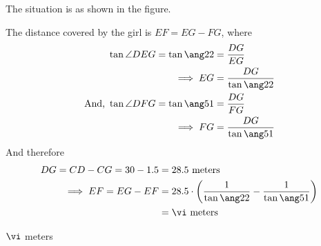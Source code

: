 \begin{solution}[\halfpage]
	The situation is as shown in the figure. 
  
  The distance covered by the girl is $EF = EG - FG$, where
	\begin{align}
		\tan\angle{DEG} = \tan\ang\va &= \dfrac{DG}{EG} \\
		\implies EG &= \dfrac{DG}{\tan\ang\va} \\
		\text{And, }\tan\angle{DFG} = \tan\ang\vb &= \dfrac{DG}{FG} \\
		\implies FG &= \dfrac{DG}{\tan\ang\vb}
	\end{align}
  And therefore 
	\begin{align}
    DG = CD - CG = 30 - 1.5 &= 28.5\text{ meters} \\ 
		\implies EF = EG - EF &= 28.5\cdot\left(\dfrac{1}{\tan\ang\va} - \dfrac{1}{\tan\ang\vb}\right) \\
    &= \vi\text{ meters}
	\end{align}
\end{solution}

\ifprintanswers\begin{codex}$\vi$ meters\end{codex}\fi
